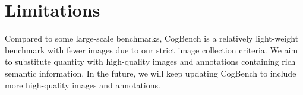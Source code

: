 \section*{Limitations}

Compared to some large-scale benchmarks, CogBench is a relatively light-weight benchmark with fewer images due to our strict image collection criteria.
We aim to substitute quantity with high-quality images and annotations containing rich semantic information.
In the future, we will keep updating CogBench to include more high-quality images and annotations.